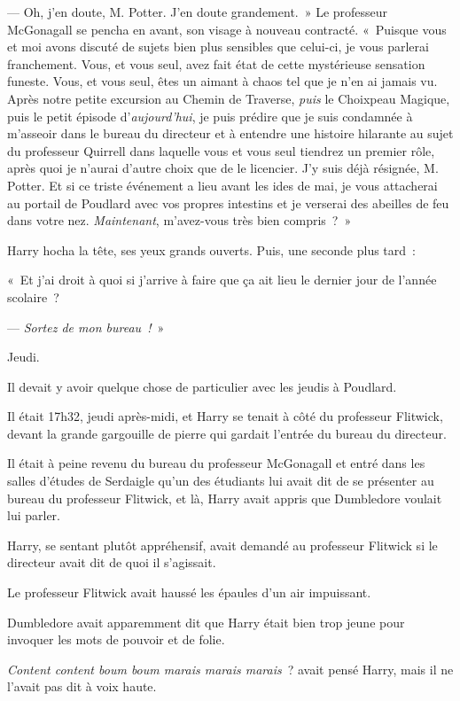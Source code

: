 --- Oh, j'en doute, M. Potter. J'en doute grandement.~» Le professeur McGonagall se pencha en avant, son visage à nouveau contracté. «~Puisque vous et moi avons discuté de sujets bien plus sensibles que celui-ci, je vous parlerai franchement. Vous, et vous seul, avez fait état de cette mystérieuse sensation funeste. Vous, et vous seul, êtes un aimant à chaos tel que je n'en ai jamais vu. Après notre petite excursion au Chemin de Traverse, \emph{puis} le Choixpeau Magique, puis le petit épisode d'\emph{aujourd'hui}, je puis prédire que je suis condamnée à m'asseoir dans le bureau du directeur et à entendre une histoire hilarante au sujet du professeur Quirrell dans laquelle vous et vous seul tiendrez un premier rôle, après quoi je n'aurai d'autre choix que de le licencier. J'y suis déjà résignée, M. Potter. Et si ce triste événement a lieu avant les ides de mai, je vous attacherai au portail de Poudlard avec vos propres intestins et je verserai des abeilles de feu dans votre nez. \emph{Maintenant}, m'avez-vous très bien compris~?~»

Harry hocha la tête, ses yeux grands ouverts. Puis, une seconde plus tard~:

«~Et j'ai droit à quoi si j'arrive à faire que ça ait lieu le dernier jour de l'année scolaire~?

--- \emph{Sortez de mon bureau~!}~»

\later

Jeudi.

Il devait y avoir quelque chose de particulier avec les jeudis à Poudlard.

Il était 17h32, jeudi après-midi, et Harry se tenait à côté du professeur Flitwick, devant la grande gargouille de pierre qui gardait l'entrée du bureau du directeur.

Il était à peine revenu du bureau du professeur McGonagall et entré dans les salles d'études de Serdaigle qu'un des étudiants lui avait dit de se présenter au bureau du professeur Flitwick, et là, Harry avait appris que Dumbledore voulait lui parler.

Harry, se sentant plutôt appréhensif, avait demandé au professeur Flitwick si le directeur avait dit de quoi il s'agissait.

Le professeur Flitwick avait haussé les épaules d'un air impuissant.

Dumbledore avait apparemment dit que Harry était bien trop jeune pour invoquer les mots de pouvoir et de folie.

\emph{Content content boum boum marais marais marais}~? avait pensé Harry, mais il ne l'avait pas dit à voix haute.

